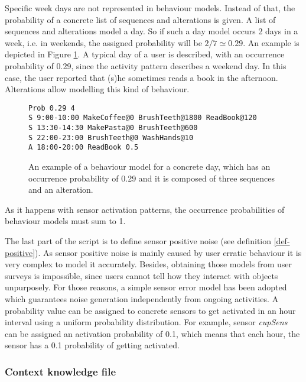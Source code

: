 Specific week days are not represented in behaviour models. Instead of that, the probability of a concrete list of sequences and alterations is given. A list of sequences and alterations model a day. So if such a day model occurs 2 days in a week, i.e. in weekends, the assigned probability will be $2/7 \simeq 0.29$. An example is depicted in Figure \ref{fig:activity-pattern}. A typical day of a user is described, with an occurrence probability of 0.29, since the activity pattern describes a weekend day. In this case, the user reported that (s)he sometimes reads a book in the afternoon. Alterations allow modelling this kind of behaviour.


\begin{figure}
\begin{small}
\lstset{linewidth=\textwidth}
\begin{lstlisting}
Prob 0.29 4
S 9:00-10:00 MakeCoffee@0 BrushTeeth@1800 ReadBook@120
S 13:30-14:30 MakePasta@0 BrushTeeth@600
S 22:00-23:00 BrushTeeth@0 WashHands@10
A 18:00-20:00 ReadBook 0.5
\end{lstlisting}
\end{small}
\caption{An example of a behaviour model for a concrete day, which has an occurrence probability of 0.29 and it is composed of three sequences and an alteration.}
\label{fig:activity-pattern}
\end{figure}

As it happens with sensor activation patterns, the occurrence probabilities of behaviour models must sum to 1.

The last part of the script is to define sensor positive noise (see definition \ref{def-positive}). As sensor positive noise is mainly caused by user erratic behaviour it is very complex to model it accurately. Besides, obtaining those models from user surveys is impossible, since users cannot tell how they interact with objects unpurposely. For those reasons, a simple sensor error model has been adopted which guarantees noise generation independently from ongoing activities. A probability value can be assigned to concrete sensors to get activated in an hour interval using a uniform probability distribution. For example, sensor \textit{cupSens} can be assigned an activation probability of 0.1, which means that each hour, the sensor has a 0.1 probability of getting activated. 

\subsubsection*{Context knowledge file}

